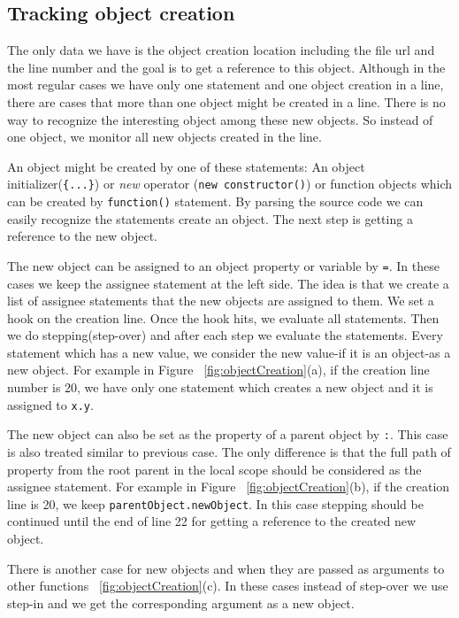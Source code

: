 \documentclass[preprint]{sigplanconf}
\begin{document}
\subsection{Tracking object creation}
The only data we have is the object creation location including the
file url and the line number and the goal is to get a reference to
this object. Although in the most regular cases we have only one
statement and one object creation in a line, there are cases that more
than one object might be created in a line. There is no way to
recognize the interesting object among these new objects. So instead
of one object, we monitor all new objects created in the line.

An object might be created by one of these statements: An object
initializer(\texttt{\{...\}}) or \textit{new} operator (\texttt{new
  constructor()}) or function objects which can be created by
\texttt{function()} statement. By parsing the source code we can
easily recognize the statements create an object. The next step is
getting a reference to the new object.

The new object can be assigned to an object property or variable by
\texttt{=}. In these cases we keep the assignee statement at the left
side. The idea is that we create a list of assignee statements that
the new objects are assigned to them. We set a hook on the creation
line. Once the hook hits, we evaluate all statements. Then we do
stepping(step-over) and after each step we evaluate the
statements. Every statement which has a new value, we consider the new
value-if it is an object-as a new object. For example in Figure
~\ref{fig:objectCreation}(a), if the creation line number is 20, we
have only one statement which creates a new object and it is assigned
to \texttt{x.y}.

The new object can also be set as the property of a parent object by
\texttt{:}. This case is also treated similar to previous case. The
only difference is that the full path of property from the root parent
in the local scope should be considered as the assignee statement. For
example in Figure ~\ref{fig:objectCreation}(b), if the creation line
is 20, we keep \texttt{parentObject.newObject}. In this case stepping
should be continued until the end of line 22 for getting a reference
to the created new object.

There is another case for new objects and when they are passed as
arguments to other functions ~\ref{fig:objectCreation}(c). In these
cases instead of step-over we use step-in and we get the corresponding
argument as a new object.
\end{document}

